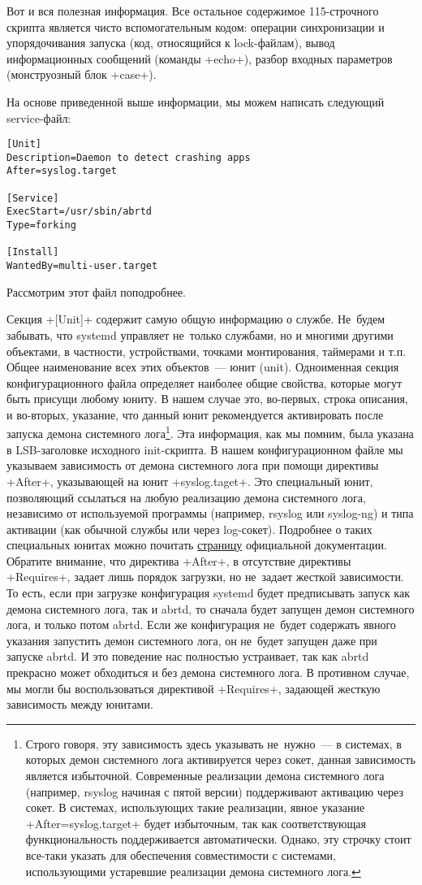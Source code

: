 \documentclass[10pt,oneside,a4paper]{article}
\begin{document}
Вот и вся полезная информация. Все остальное содержимое 115-строчного скрипта
является чисто вспомогательным кодом: операции синхронизации и упорядочивания
запуска (код, относящийся к lock-файлам), вывод информационных сообщений
(команды +echo+), разбор входных параметров (монструозный блок
+case+).

На основе приведенной выше информации, мы можем написать следующий
service-файл: 
\begin{Verbatim}
[Unit]
Description=Daemon to detect crashing apps
After=syslog.target

[Service]
ExecStart=/usr/sbin/abrtd
Type=forking

[Install]
WantedBy=multi-user.target
\end{Verbatim}

Рассмотрим этот файл поподробнее.

Секция +[Unit]+ содержит самую общую информацию о службе. Не~будем
забывать, что systemd управляет не~только службами, но и многими другими
объектами, в частности, устройствами, точками монтирования, таймерами и т.п.
Общее наименование всех этих объектов~--- юнит (unit). Одноименная секция
конфигурационного файла определяет наиболее общие свойства, которые могут
быть присущи любому юниту. В нашем случае это, во-первых, строка описания, и
во-вторых, указание, что данный юнит рекомендуется активировать после запуска
демона системного лога\footnote{Строго говоря, эту зависимость здесь
указывать не~нужно~--- в системах, в которых демон системного лога активируется
через сокет, данная зависимость является избыточной. Современные реализации
демона системного лога (например, rsyslog начиная с пятой версии)
поддерживают активацию через сокет. В системах, использующих такие
реализации, явное указание +After=syslog.target+ будет избыточным, так
как соответствующая функциональность поддерживается автоматически. Однако,
эту строчку стоит все-таки указать для обеспечения совместимости с системами,
использующими устаревшие реализации демона системного лога.}. Эта информация,
как мы помним, была указана в LSB-заголовке исходного init-скрипта. В нашем
конфигурационном файле мы указываем зависимость от демона системного лога при
помощи директивы +After+, указывающей на юнит +syslog.taget+. Это
специальный юнит, позволяющий ссылаться на любую реализацию демона системного
лога, независимо от используемой программы (например, rsyslog или syslog-ng)
и типа активации (как обычной службы или через log-сокет). Подробнее о таких
специальных юнитах можно почитать
\href{http://0pointer.de/public/systemd-man/systemd.special.html}{страницу}
официальной документации. Обратите внимание, что директива +After+, в
отсутствие директивы +Requires+, задает лишь порядок загрузки, но
не~задает жесткой зависимости. То есть, если при загрузке конфигурация
systemd будет предписывать запуск как демона системного лога, так и abrtd, то
сначала будет запущен демон системного лога, и только потом abrtd. Если же
конфигурация не~будет содержать явного указания запустить демон системного
лога, он не~будет запущен даже при запуске abrtd. И это поведение нас
полностью устраивает, так как abrtd прекрасно может обходиться и без демона
системного лога. В противном случае, мы могли бы воспользоваться директивой
+Requires+, задающей жесткую зависимость между юнитами.
\end{document}
